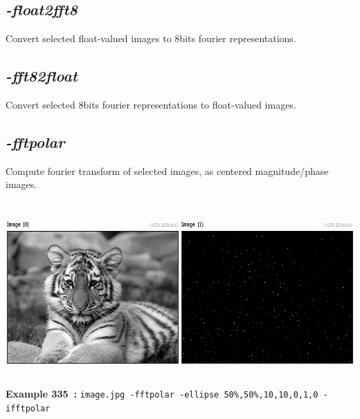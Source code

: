 \documentclass[a4paper,11pt,twoside]{book}
\begin{document}
\subsection{\emph{-float2fft8} }\vspace*{-0.5em}
Convert selected float-valued images to 8bits fourier representations.


\subsection{\emph{-fft82float} }\vspace*{-0.5em}
Convert selected 8bits fourier representations to float-valued images.


\subsection{\emph{-fftpolar} }\vspace*{-0.5em}
Compute fourier transform of selected images, as centered magnitude/phase images.
\begin{center}\includegraphics[keepaspectratio=true,height=7cm,width=\textwidth]{img/gmic_def335.jpg}\\
{\footnotesize \textbf{Example 335~:} \texttt{image.jpg -fftpolar -ellipse 50\%,50\%,10,10,0,1,0 -ifftpolar}}
\end{center}
\end{document}
